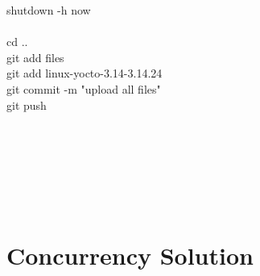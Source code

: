\documentclass[letterpaper,10pt,titlepage]{article}
\begin{document}
shutdown -h now \\
\\
cd .. \\
git add files \\
git add linux-yocto-3.14-3.14.24 \\
git commit -m "upload all files" \\
git push \\
\\
\\
\\
\\
\\
\\
\section{Concurrency Solution} 
\end{document}
